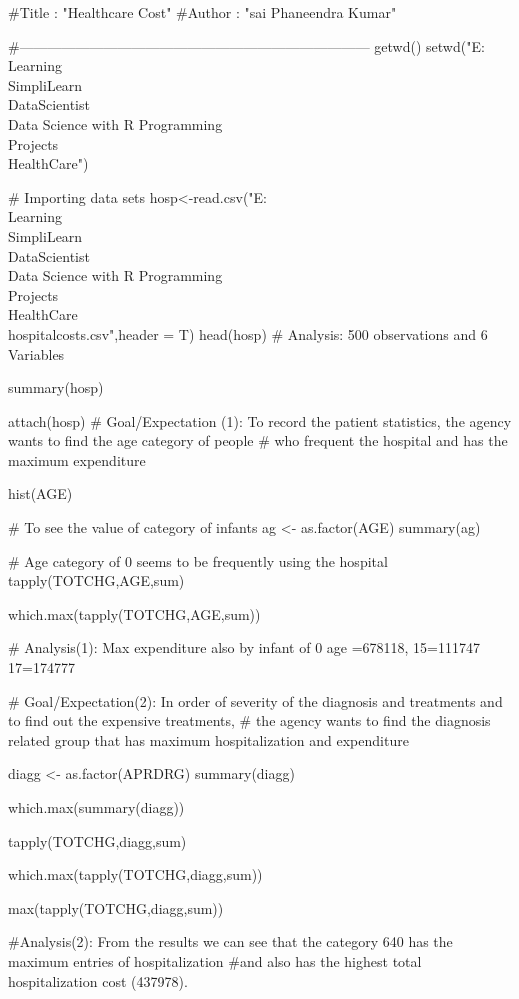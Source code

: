 #Title  : "Healthcare Cost"
#Author : "sai Phaneendra Kumar"

#---------------------------------------------------------------------------
getwd()
setwd("E:\\Learning\\SimpliLearn\\DataScientist\\Data Science with R Programming\\Projects\\HealthCare")

# Importing data sets
hosp<-read.csv("E:\\Learning\\SimpliLearn\\DataScientist\\Data Science with R Programming\\Projects\\HealthCare\\hospitalcosts.csv",header = T)
head(hosp) # Analysis: 500 observations and 6 Variables

summary(hosp)

attach(hosp)
# Goal/Expectation (1): To record the patient statistics, the agency wants to find the age category of people 
# who frequent the hospital and has the maximum expenditure

hist(AGE)

# To see the value of category of infants
ag <- as.factor(AGE)
summary(ag)

# Age category of 0 seems to be  frequently using the hospital
tapply(TOTCHG,AGE,sum)


which.max(tapply(TOTCHG,AGE,sum))

# Analysis(1): Max expenditure also by infant of 0 age =678118, 15=111747 17=174777

# Goal/Expectation(2): In order of severity of the diagnosis and treatments and to find out the expensive treatments, 
# the agency wants to find the diagnosis related group that has maximum hospitalization and expenditure

diagg <- as.factor(APRDRG)
summary(diagg)

which.max(summary(diagg))

tapply(TOTCHG,diagg,sum)

which.max(tapply(TOTCHG,diagg,sum))

max(tapply(TOTCHG,diagg,sum))

#Analysis(2): From the results we can see that the category 640 has the maximum entries of hospitalization
#and also has the highest total hospitalization cost (437978).   

